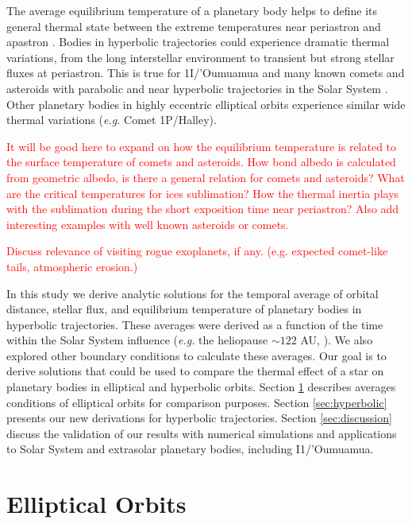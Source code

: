 \documentclass[a4paper,fleqn,usenatbib]{mnras}
\newcommand{\fix}{\textcolor{red}}
\begin{document}
The average equilibrium temperature of a planetary body helps to define its general thermal state between the extreme temperatures near periastron and apastron \citep{2017ApJ...837L...1M}. Bodies in hyperbolic trajectories could experience dramatic thermal variations, from the long interstellar environment to transient but strong stellar fluxes at periastron. This is true for 1I/'Oumuamua and many known comets and asteroids with parabolic and near hyperbolic trajectories in the Solar System \citep{SSD(2018)}. Other planetary bodies in highly eccentric elliptical orbits experience similar wide thermal variations (\emph{e.g.} Comet 1P/Halley).

\fix{It will be good here to expand on how the equilibrium temperature is related to the surface temperature of comets and asteroids. How bond albedo is calculated from geometric albedo, is there a general relation for comets and asteroids? What are the critical temperatures for ices sublimation? How the thermal inertia plays with the sublimation during the short exposition time near periastron? Also add interesting examples with well known asteroids or comets.}

\fix{Discuss relevance of visiting rogue exoplanets, if any. (e.g. expected comet-like tails, atmospheric erosion.)}  

In this study we derive analytic solutions for the temporal average of orbital distance, stellar flux, and equilibrium temperature of planetary bodies in hyperbolic trajectories. These averages were derived as a function of the time within the Solar System influence (\emph{e.g.} the heliopause $\sim122$ AU, \citet{2017ApJ...834..197C}). We also explored other boundary conditions to calculate these averages. Our goal is to derive solutions that could be used to compare the thermal effect of a star on planetary bodies in elliptical and hyperbolic orbits. Section \ref{sec:elliptical} describes averages conditions of elliptical orbits for comparison purposes. Section \ref{sec:hyperbolic} presents our new derivations for hyperbolic trajectories. Section \ref{sec:discussion} discuss the validation of our results with numerical simulations and applications to Solar System and extrasolar planetary bodies, including I1/'Oumuamua.


\section{Elliptical Orbits} \label{sec:elliptical}
\end{document}
